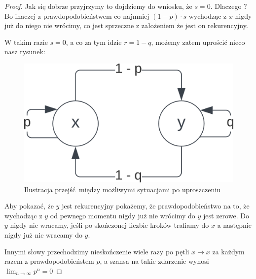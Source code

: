 \begin{proof}
	Jak się dobrze przyjrzymy to dojdziemy do wniosku, że \( s = 0 \). Dlaczego ?
	Bo inaczej z prawdopodobieństwem co najmniej \( (1-p) \cdot s \) wychodząc z \( x \)
	nigdy już do niego nie wrócimy, co jest sprzeczne z założeniem że jest on rekurencyjny.

	W takim razie \(s = 0\), a co za tym idzie \(r = 1 - q\), możemy zatem uprościć nieco nasz rysunek:

	\begin{figure}[H]
		\centering
		\includegraphics{img/markov-chains/recurrent-communicated-a-posteriori.png}
		\caption{Ilustracja przejść między możliwymi sytuacjami po uproszczeniu}
	\end{figure}

	Aby pokazać, że \( y \) jest rekurencyjny pokażemy, że prawdopodobieństwo na to, że wychodząc z \(y \) od pewnego momentu nigdy już nie wrócimy do \( y \) jest zerowe.
	Do \( y \) nigdy nie wracamy, jeśli po skończonej liczbie kroków trafiamy do \( x \) a następnie
	nigdy już nie wracamy do \( y \).

	Innymi słowy przechodzimy nieskończenie wiele razy po pętli \( x \rightarrow x \) za każdym razem z prawdopodobieństem \( p \), a szansa na takie zdarzenie wynosi \( \lim_{n \rightarrow \infty} p^n = 0 \)





\end{proof}

